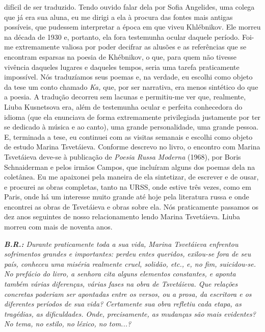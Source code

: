 difícil de ser traduzido. Tendo ouvido falar dela por Sofia Angelides,
uma colega que já era sua aluna, eu me dirigi a ela à procura das fontes
mais antigas possíveis, que pudessem interpretar a época em que viveu
Khlébnikov. Ele morreu na década de 1930 e, portanto, ela fora
testemunha ocular daquele período. Foi-me extremamente valiosa por poder
decifrar as alusões e as referências que se encontram esparsas na poesia
de Khébnikov, o que, para quem não tivesse vivência daqueles lugares e
daqueles tempos, seria uma tarefa praticamente impossível. Nós
traduzíamos seus poemas e, na verdade, eu escolhi como objeto da tese um
conto chamado \emph{Ka,} que, por ser narrativa, era menos sintético do
que a poesia. A tradução decorreu sem lacunas e permitiu-me ver que,
realmente, Liuba Kusnetsova era, além de testemunha ocular e perfeita
conhecedora do idioma (que ela enunciava de forma extremamente
privilegiada justamente por ter se dedicado à música e ao canto), uma
grande personalidade, uma grande pessoa. E, terminada a tese, eu
continuei com as visitas semanais e escolhi como objeto de estudo Marina
Tsvetáieva. Conforme descrevo no livro, o encontro com Marina Tsvetáieva
deve-se à publicação de \emph{Poesia Russa Moderna} (1968), por Boris
Schnaiderman e pelos irmãos Campos, que incluíram alguns dos poemas dela
na coletânea. Eu me apaixonei pela maneira de ela sintetizar, de
escrever e de ousar, e procurei as obras completas, tanto na URSS, onde
estive três vezes, como em Paris, onde há um interesse muito grande até
hoje pela literatura russa e onde encontrei as obras de Tsvetáieva e
obras sobre ela. Nós praticamente passamos os dez anos seguintes de
nosso relacionamento lendo Marina Tsvetáieva. Liuba morreu com mais de
noventa anos.

\emph{\textbf{B.R.:} Durante praticamente toda a sua vida, Marina
Tsvetáieva enfrentou sofrimentos grandes e importantes: perdeu entes
queridos, exilou-se fora de seu país, conheceu uma miséria realmente
cruel, solidão, etc., e, no fim, suicidou-se. No prefácio do livro, a
senhora cita alguns elementos constantes, e aponta também várias
diferenças, várias fases na obra de Tsvetáieva. Que relações concretas
poderiam ser apontadas entre os versos, ou a prosa, da escritora e os
diferentes períodos de sua vida? Certamente sua obra refletiu cada
etapa, as tragédias, as dificuldades. Onde, precisamente, as mudanças
são mais evidentes? No tema, no estilo, no léxico, no tom...?}

